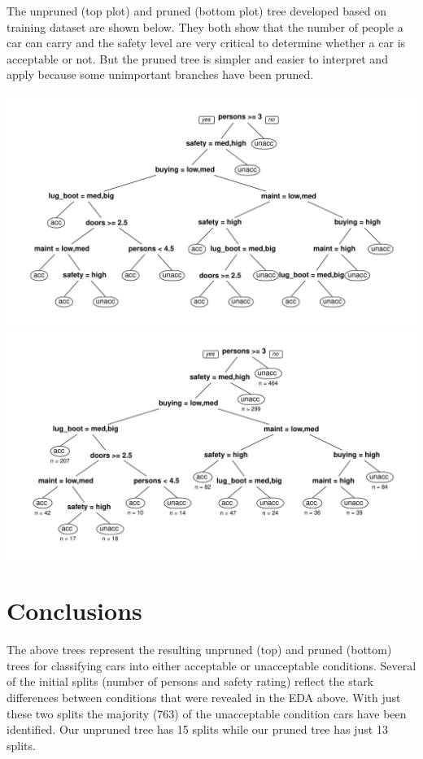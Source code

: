 \documentclass[]{article}
\begin{document}
The unpruned (top plot) and pruned (bottom plot) tree developed based on
training dataset are shown below. They both show that the number of
people a car can carry and the safety level are very critical to
determine whether a car is acceptable or not. But the pruned tree is
simpler and easier to interpret and apply because some unimportant
branches have been pruned.

\includegraphics{Project3_files/figure-latex/Classifier - Fei-1.pdf}
\includegraphics{Project3_files/figure-latex/Classifier - Fei-2.pdf}

\section{Conclusions}\label{conclusions}

The above trees represent the resulting unpruned (top) and pruned
(bottom) trees for classifying cars into either acceptable or
unacceptable conditions. Several of the initial splits (number of
persons and safety rating) reflect the stark differences between
conditions that were revealed in the EDA above. With just these two
splits the majority (763) of the unacceptable condition cars have been
identified. Our unpruned tree has 15 splits while our pruned tree has
just 13 splits.
\end{document}
